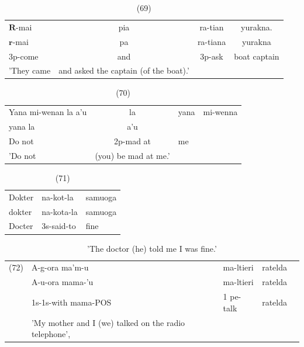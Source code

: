 \documentclass[10pt]{article}
\begin{document}
\begin{table}[h]
\begin{center}
\captionsetup{labelformat=empty}
\caption{(69)}
\begin{tabular}{lccc}
\(\boldsymbol{R}\)-mai & pia & ra-tian & yurakna. \\
\(\boldsymbol{r}\)-mai & pa & ra-tiana & yurakna \\
3p-come & and & 3p-ask & boat captain \\
'They came & and asked the captain (of the boat).' &  &  \\
\end{tabular}
\end{center}
\end{table}

\begin{table}[h]
\begin{center}
\captionsetup{labelformat=empty}
\caption{(70)}
\begin{tabular}{lcll}
Yana mi-wenan la a'u & la & yana & mi-wenna \\
yana la & a'u &  &  \\
Do not & 2p-mad at & me &  \\
'Do not & (you) be mad at me.' &  &  \\
\end{tabular}
\end{center}
\end{table}

\begin{table}[h]
\begin{center}
\captionsetup{labelformat=empty}
\caption{(71)}
\begin{tabular}{lll}
Dokter & na-kot-la & samuoga \\
dokter & na-kota-la & samuoga \\
Docter & 3s-said-to & fine \\
\end{tabular}
\end{center}
\end{table}

\begin{table}[h]
\begin{center}
\captionsetup{labelformat=empty}
\caption{'The doctor (he) told me I was fine.'}
\begin{tabular}{llllr}
(72) & A-g-ora ma'm-u & ma-ltieri & ratelda \\
 & A-u-ora mama-'u & ma-ltieri & ratelda \\
 & 1s-1s-with mama-POS & 1 pe-talk & ratelda \\
 & 'My mother and I (we) talked on the radio telephone', &  &  \\
\end{tabular}
\end{center}
\end{table}
\end{document}
